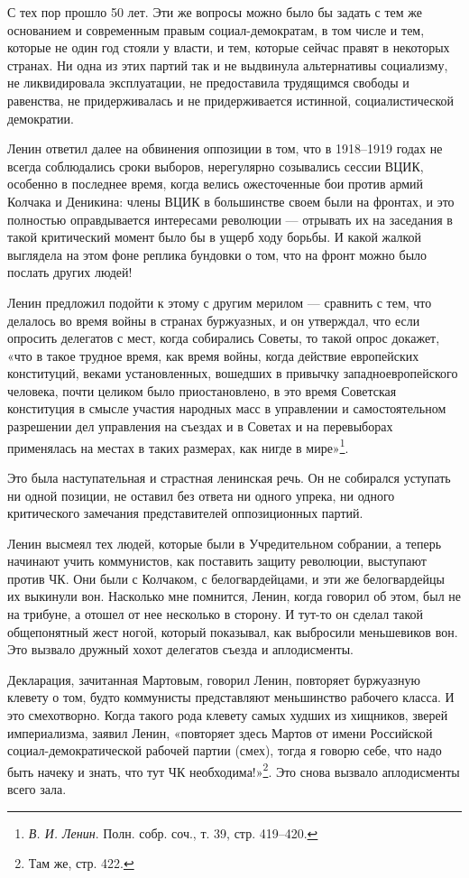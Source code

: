 \documentclass[12pt, a4paper, openany]{book}
\begin{document}
С тех пор прошло 50 лет. Эти же вопросы можно было бы задать с тем же основанием и современным правым социал-демократам, в том числе и тем, которые не один год стояли у власти, и тем, которые сейчас правят в некоторых странах. Ни одна из этих партий так и не выдвинула альтернативы социализму, не ликвидировала эксплуатации, не предоставила трудящимся свободы и равенства, не придерживалась и не придерживается истинной, социалистической демократии.

Ленин ответил далее на обвинения оппозиции в том, что в 1918–1919 годах не всегда соблюдались сроки выборов, нерегулярно созывались сессии ВЦИК, особенно в последнее время, когда велись ожесточенные бои против армий Колчака и Деникина: члены ВЦИК в большинстве своем были на фронтах, и это полностью оправдывается интересами революции — отрывать их на заседания в такой критический момент было бы в ущерб ходу борьбы. И какой жалкой выглядела на этом фоне реплика бундовки о том, что на фронт можно было послать других людей!

Ленин предложил подойти к этому с другим мерилом — сравнить с тем, что делалось во время войны в странах буржуазных, и он утверждал, что если опросить делегатов с мест, когда собирались Советы, то такой опрос докажет, «что в такое трудное время, как время войны, когда действие европейских конституций, веками установленных, вошедших в привычку западноевропейского человека, почти целиком было приостановлено, в это время Советская конституция в смысле участия народных масс в управлении и самостоятельном разрешении дел управления на съездах и в Советах и на перевыборах применялась на местах в таких размерах, как нигде в мире»\footnote{\textit{В. И. Ленин}. Полн. собр. соч., т. 39, стр. 419–420.}.

Это была наступательная и страстная ленинская речь. Он не собирался уступать ни одной позиции, не оставил без ответа ни одного упрека, ни одного критического замечания представителей оппозиционных партий.

Ленин высмеял тех людей, которые были в Учредительном собрании, а теперь начинают учить коммунистов, как поставить защиту революции, выступают против ЧК. Они были с Колчаком, с белогвардейцами, и эти же белогвардейцы их выкинули вон. Насколько мне помнится, Ленин, когда говорил об этом, был не на трибуне, а отошел от нее несколько в сторону. И тут-то он сделал такой общепонятный жест ногой, который показывал, как выбросили меньшевиков вон. Это вызвало дружный хохот делегатов съезда и аплодисменты.

Декларация, зачитанная Мартовым, говорил Ленин, повторяет буржуазную клевету о том, будто коммунисты представляют меньшинство рабочего класса. И это смехотворно. Когда такого рода клевету самых худших из хищников, зверей империализма, заявил Ленин, «повторяет здесь Мартов от имени Российской социал-демократической рабочей партии (смех), тогда я говорю себе, что надо быть начеку и знать, что тут ЧК необходима!»\footnote{Там же, стр. 422.}. Это снова вызвало аплодисменты всего зала.
\end{document}
